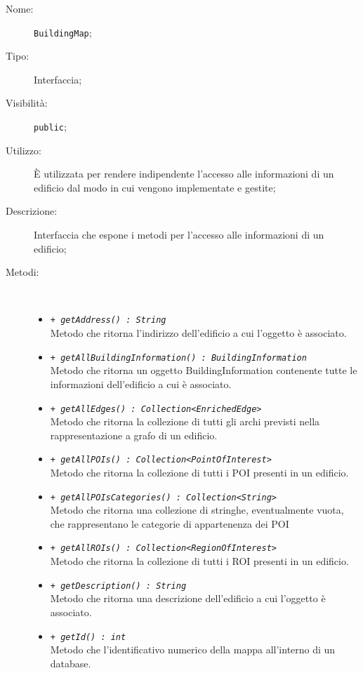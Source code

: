 \documentclass[../DefinizioneDiProdotto.tex]{subfiles}
\begin{document}
\begin{description}
	\item[Nome:] \texttt{BuildingMap};
	\item[Tipo:] Interfaccia;
	\item[Visibilità:] \texttt{public};
	\item[Utilizzo:] È utilizzata per rendere indipendente l'accesso alle informazioni di un edificio dal modo in cui vengono implementate e gestite;
	\item[Descrizione:] Interfaccia che espone i metodi per l'accesso alle informazioni di un edificio;
	\item[Metodi:] \
	\begin{itemize}
		\item \texttt{+ \textit{getAddress() : String}}\\
		Metodo che ritorna l'indirizzo dell'edificio a cui l'oggetto è associato.
		\item \texttt{+ \textit{getAllBuildingInformation() : BuildingInformation}}\\
		Metodo che ritorna un oggetto BuildingInformation contenente tutte le informazioni dell'edificio a cui è associato.
		\item \texttt{+ \textit{getAllEdges() : Collection<EnrichedEdge>}}\\
		Metodo che ritorna la collezione di tutti gli archi previsti nella rappresentazione a grafo di un edificio.
		\item \texttt{+ \textit{getAllPOIs() : Collection<PointOfInterest>}}\\
		Metodo che ritorna la collezione di tutti i POI presenti in un edificio.
		\item \texttt{+ \textit{getAllPOIsCategories() : Collection<String>}}\\
		Metodo che ritorna una collezione di stringhe, eventualmente vuota, che rappresentano le categorie di appartenenza dei POI
		\item \texttt{+ \textit{getAllROIs() : Collection<RegionOfInterest>}}\\
		Metodo che ritorna la collezione di tutti i ROI presenti in un edificio.
		\item \texttt{+ \textit{getDescription() : String}}\\
		Metodo che ritorna una descrizione dell'edificio a cui l'oggetto è associato.
		\item \texttt{+ \textit{getId() : int}}\\
		Metodo che l'identificativo numerico della mappa all'interno di un database.

\end{itemize}
\end{description}
\end{document}
